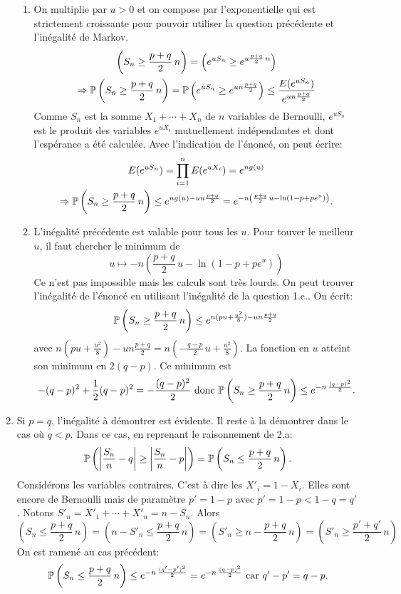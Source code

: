 \begin{enumerate}
\begin{enumerate}
 \item On multiplie par $u>0$ et on compose par l'exponentielle qui est strictement croissante pour pouvoir utiliser la question précédente et l'inégalité de Markov.
\begin{multline*}
 \left( S_n \geq\frac{p+q}{2}\,n\right) = \left( e^{uS_n} \geq e^{u\frac{p+q}{2}\,n}\right)\\
 \Rightarrow \mathbb{P} \left( S_n \geq\frac{p+q}{2}\,n\right) = \mathbb{P}\left( e^{uS_n} \geq e^{un\frac{p+q}{2}}\right)
 \leq \frac{E(e^{uS_n})}{e^{un\frac{p+q}{2}}}
\end{multline*}
Comme $S_n$ est la somme $X_1 + \cdots + X_n$ de $n$ variables de Bernoulli, $e^{uS_n}$ est le produit des variables $e^{uX_i}$ mutuellement indépendantes et dont l'espérance a été calculée. Avec l'indication de l'énoncé, on peut écrire:
\begin{multline*}
 E(e^{uS_n})
 = \prod_{i=1}^{n}E(e^{uX_i}) = e^{ng(u)} \\
\Rightarrow 
\mathbb{P} \left( S_n \geq\frac{p+q}{2}\,n\right) \leq e^{ng(u) - un \frac{p+q}{2}}
= e^{-n\left(\frac{p+q}{2}\, u - \ln(1-p + pe^{u})  \right) }.
\end{multline*}

 \item L'inégalité précédente est valable pour tous les $u$. Pour touver le meilleur $u$, il faut chercher le minimum de 
\[
 u \mapsto -n\left(\frac{p+q}{2}\, u - \ln(1-p + pe^{u})  \right)
\]
Ce n'est pas impossible mais les calculs sont très lourds. On peut trouver l'inégalité de l'énoncé en utilisant l'inégalité de la question 1.c.. On écrit:
\[
 \mathbb{P} \left( S_n \geq\frac{p+q}{2}\,n\right) \leq e^{n(pu + \frac{u^2}{8}) - un \frac{p+q}{2}} 
\]
avec $n(pu + \frac{u^2}{8}) - un \frac{p+q}{2} = n\left( -\frac{q-p}{2}\,u +\frac{u^2}{8}\right)$. La fonction en $u$ atteint son minimum en $2(q-p)$. Ce minimum est
\[
 -(q-p)^2 +\frac{1}{2}(q-p)^2= -\frac{(q-p)^2}{2}\text{ donc }
 \mathbb{P} \left( S_n \geq\frac{p+q}{2}\,n\right) \leq e^{-n\,\frac{(q-p)^2}{2}}.
\]
\end{enumerate}

 \item Si $p=q$, l'inégalité à démontrer est évidente. Il reste à la démontrer dans le cas où $q < p$. Dans ce cas, en reprenant le raisonnement de 2.a:
\[
 \mathbb{P}\left( \left|\frac{S_n}{n}-q\right| \geq \left|\frac{S_n}{n}-p\right|\right)
 = \mathbb{P}\left( S_n \leq \frac{p+q}{2}\, n\right). 
\]
Considérons les variables \og contraires\fg. C'est à dire les $X'_i=1-X_i$. Elles sont encore de Bernoulli mais de paramètre $p' = 1-p$ avec $p'= 1-p < 1-q = q'$. Notons $S'_n = X'_1 + \cdots + X'_n = n - S_n$. Alors
\[
 \left( S_n \leq \frac{p+q}{2}\, n\right)
 = \left( n-S'_n \leq \frac{p+q}{2}\, n\right)
 = \left( S'_n \geq n -\frac{p+q}{2}\, n\right) 
 = \left( S'_n \geq \frac{p'+q'}{2}\, n\right)
\]
On est ramené au cas précédent:
\[
 \mathbb{P}\left( S_n \leq \frac{p+q}{2}\, n\right) \leq
 e^{-n\,\frac{(q'-p')^2}{2}} = e^{-n\,\frac{(q-p)^2}{2}}
 \text{ car } q' - p' = q - p.
\]

\end{enumerate}
